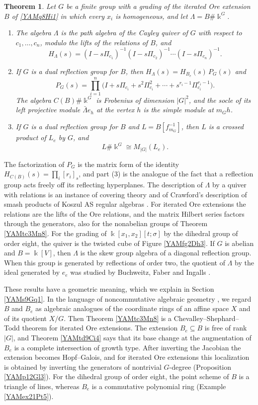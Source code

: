 \documentclass[reqno]{amsart}
\numberwithin{equation}{section}
\theoremstyle{definition}
\theoremstyle{remark}
\theoremstyle{plain}
\newtheorem{introtheorem}{Theorem}
\newcommand{\kk}{\Bbbk}
\begin{document}
\begin{introtheorem}\label{YAMtd5Qv1}
Let $G$ be a finite group with a grading of the iterated Ore extension $B$ of \eqref{YAMq8Hi1} in which every $x_i$ is homogeneous, and let $\Lambda=B\#\kk^G$.
\begin{enumerate}
\item The algebra $\Lambda$ is the path algebra of the Cayley quiver of $G$ with respect to $c_1,\dots,c_n$, modulo the lifts of the relations of $B$, and
\[
H_\Lambda(s)=(I-s\Pi_{c_1})^{-1}(I-s\Pi_{c_2})^{-1}\cdots(I-s\Pi_{c_n})^{-1}.
\]
\item If $G$ is a dual reflection group for $B$, then $H_\Lambda(s)=H_{B_e}(s)\,P_G(s)$ and
\[
P_G(s)=\prod_{i=1}^n\big(I+s\Pi_{c_i}+s^2\Pi_{c_i}^2+\cdots+s^{r_i-1}\Pi_{c_i}^{r_i-1}\big).
\]
The algebra $C(B)\#\kk^G$ is Frobenius of dimension $|G|^2$, and the socle of its left projective module $\bar\Lambda e_h$ at the vertex $h$ is the simple module at $m_Gh$.
\item If $G$ is a dual reflection group for $B$ and $L=B[f_{m_G}^{-1}]$, then $L$ is a crossed product of $L_e$ by $G$, and
\[
L\#\kk^G\cong M_{|G|}(L_e).
\]
\end{enumerate}
\end{introtheorem}

The factorization of $P_G$ is the matrix form of the identity $H_{C(B)}(s)=\prod_i[r_i]_s$, and part (3) is the analogue of the fact that a reflection group acts freely off its reflecting hyperplanes. The description of $\Lambda$ by a quiver with relations is an instance of covering theory \cite{Gre,CM2,Asa} and of Crawford's description of smash products of Koszul AS regular algebras \cite[Theorem 1.2]{Cra22}. For iterated Ore extensions the relations are the lifts of the Ore relations, and the matrix Hilbert series factors through the generators, also for the nonabelian groups of Theorem \ref{YAMtc3Mn8}. For the grading of $\kk[x_1,x_2][t;\sigma]$ by the dihedral group of order eight, the quiver is the twisted cube of Figure \ref{YAMfg2Dh3}. If $G$ is abelian and $B=\kk[V]$, then $\Lambda$ is the skew group algebra of a diagonal reflection group. When this group is generated by reflections of order two, the quotient of $\Lambda$ by the ideal generated by $e_e$ was studied by Buchweitz, Faber and Ingalls \cite[Theorem 4.17 and Corollary 4.19]{BFI}.

These results have a geometric meaning, which we explain in Section \ref{YAMs9Gq1}. In the language of noncommutative algebraic geometry \cite{AZ}, we regard $B$ and $B_e$ as algebraic analogues of the coordinate rings of an affine space $X$ and of its quotient $X/G$. Then Theorem \ref{YAMtc3Mn8} is a Chevalley--Shephard--Todd theorem for iterated Ore extensions. The extension $B_e\subseteq B$ is free of rank $|G|$, and Theorem \ref{YAMtd9Ci4} says that its base change at the augmentation of $B_e$ is a complete intersection of growth type. After inverting the Jacobian the extension becomes Hopf--Galois, and for iterated Ore extensions this localization is obtained by inverting the generators of nontrivial $G$-degree (Proposition \ref{YAMp12Gl3}). For the dihedral group of order eight, the point scheme of $B$ is a triangle of lines, whereas $B_e$ is a commutative polynomial ring (Example \ref{YAMex21Pt5}).
\end{document}
